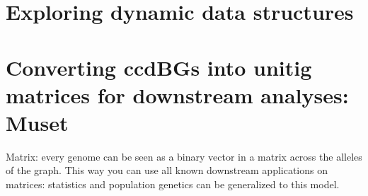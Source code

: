 \section{Exploring dynamic data structures}
\label{sec:skmers}




\section{Converting ccdBGs into unitig matrices for downstream analyses: Muset}
Matrix: every genome can be seen as a binary vector in a matrix across the alleles of the graph. This way you can use all known downstream applications on matrices: statistics and population genetics can be generalized to this model.



